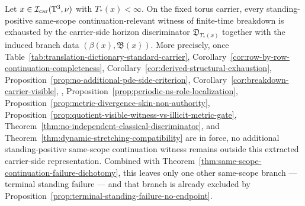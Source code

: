 \begin{manualproposition}
\label{prop:same-scope-witness-exhaustion}
Let $x\in\mathcal I_{\mathrm{car}}(\mathbb{T}^3,\nu)$ with $T_*(x)<\infty$. On the fixed torus carrier, every standing-positive same-scope continuation-relevant witness of finite-time breakdown is exhausted by the carrier-side horizon discriminator $\mathfrak D_{T_*(x)}$ together with the induced branch data $(\beta(x),\mathfrak B(x))$. More precisely, once Table~\ref{tab:translation-dictionary-standard-carrier}, Corollary~\ref{cor:row-by-row-continuation-completeness}, Corollary~\ref{cor:derived-structural-exhaustion}, Proposition~\ref{prop:no-additional-pde-side-criterion}, Corollary~\ref{cor:breakdown-carrier-visible}, \HorizonDetectabilityRef{}, Proposition~\ref{prop:periodic-ns-role-localization}, Proposition~\ref{prop:metric-divergence-skin-non-authority}, Proposition~\ref{prop:quotient-visible-witness-vs-illicit-metric-gate}, Theorem~\ref{thm:no-independent-classical-discriminator}, and Theorem~\ref{thm:dynamic-stretching-compatibility} are in force, no additional standing-positive same-scope continuation witness remains outside this extracted carrier-side representation. Combined with Theorem~\ref{thm:same-scope-continuation-failure-dichotomy}, this leaves only one other same-scope branch --- terminal standing failure --- and that branch is already excluded by Proposition~\ref{prop:terminal-standing-failure-no-endpoint}.
\end{manualproposition}

